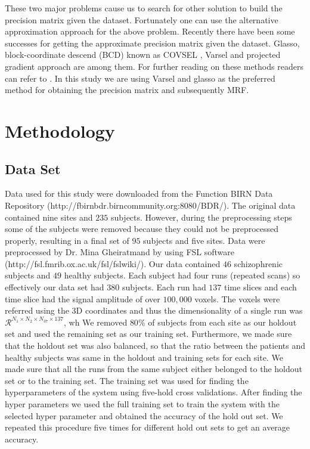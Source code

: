 \documentclass{article} %
\begin{document}
These two major problems cause us to search for other solution to build the 
precision matrix given the dataset. Fortunately one can use the alternative 
approximation approach for the above problem. Recently there have been some 
successes for getting the approximate precision matrix given the dataset. 
Glasso\cite{glasso}, block-coordinate descend (BCD) known as COVSEL \cite{Banerjee:2008:MST:1390681.1390696}, Varsel \cite{honorio2009sparse} and projected gradient \cite{lin2009learning} 
approach are among them. For further reading on these methods readers can 
refer to \cite{Rish2014Book}. In this study we are using Varsel and glasso as 
the preferred method for obtaining the precision matrix and subsequently MRF.   


\section{Methodology}

\subsection{Data Set}
Data used for this study were downloaded from the Function BIRN Data 
Repository (http://fbirnbdr.birncommunity.org:8080/BDR/). The original 
data contained nine sites and $235$ subjects. However, during the 
preprocessing steps some of the subjects were removed because they could
not be preprocessed properly, resulting in a final set of $95$ 
subjects and five sites. Data were preprocessed by Dr. Mina Gheiratmand by 
using FSL software (http://fsl.fmrib.ox.ac.uk/fsl/fslwiki/). Our data 
contained $46$ schizophrenic subjects and $49$ healthy subjects. Each subject 
had four runs (repeated scans) so effectively our data set had $380$ subjects. Each run had 
$137$ time slices and each time slice had the signal amplitude of over 
$100,000$ voxels. The voxels were referred using the 3D coordinates and thus 
the dimensionality of a single run was 
$\mathcal R^{N_1 \times N_2 \times N_37 \times 137}$, wh
We removed $80\%$ of subjects from each site as our holdout set and used the 
remaining set as our training set. Furthermore, we made sure that the holdout 
set was also balanced, so that the ratio between the patients and healthy 
subjects was same in the holdout and training sets for each site. We made 
sure that all the runs from the same subject either belonged to the holdout 
set or to the training set. The training set was used for finding the 
hyperparameters of the system using five-hold cross validations. After finding 
the hyper parameters we used the full training set to train the system with 
the selected hyper parameter and obtained the accuracy of the hold out set. 
We repeated this procedure five times for different hold out sets 
to get an average accuracy. 
\end{document}
